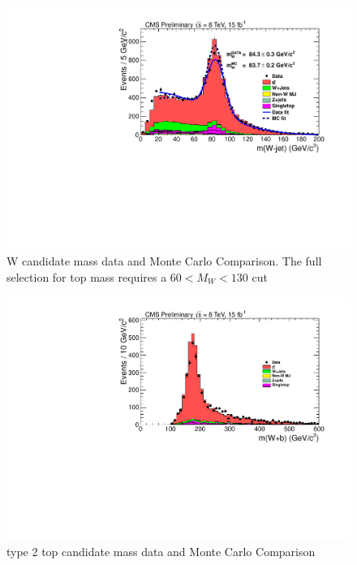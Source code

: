 \begin{figure}[htcb]
\centering
\includegraphics[width=1.0\textwidth]{figs/semiLepMass_mWCand.pdf}
\caption{W candidate mass data and Monte Carlo Comparison. The full selection for top mass requires a $60 < M_W < 130$ cut}
\label{figs:semiLepMass_mWCand}
\end{figure}

\begin{figure}[htcb]
\centering
\includegraphics[width=1.0\textwidth]{figs/semiLepMass_mTopCand.pdf}
\caption{type 2 top candidate mass data and Monte Carlo Comparison}
\label{figs:semiLepMass_mTopCand}
\end{figure}

